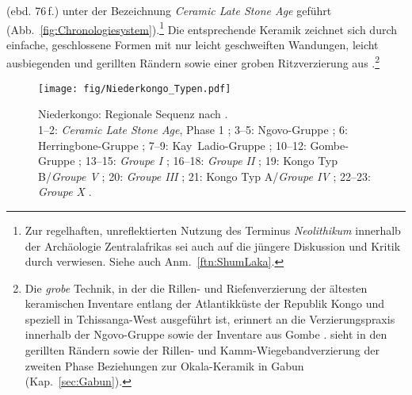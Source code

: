 (ebd. 76\,f.) unter der Bezeichnung \textit{Ceramic Late Stone Age} geführt (Abb.~\ref{fig:Chronologiesystem}).\footnote{Zur regelhaften, unreflektierten Nutzung des Terminus \textit{Neolithikum} innerhalb der Archäologie Zentralafrikas sei auch auf die jüngere Diskussion und Kritik durch \textcite[186\,f.]{Eggert.2014} verwiesen. Siehe auch Anm.~\ref{ftn:ShumLaka}.\label{ftn:Neolithikum}} Die entsprechende Keramik zeichnet sich durch einfache, geschlossene Formen mit nur leicht geschweiften Wandungen, leicht ausbiegenden und gerillten Rändern sowie einer groben Ritzverzierung aus \parencites[148 Abb.~5]{Denbow.1990}[393; Abb.~\ref{fig:Niederkongo_Sequence}.1--2]{Denbow.2012}.\footnote{Die \textit{grobe} Technik, in der die Rillen- und Riefenverzierung der ältesten keramischen Inventare entlang der Atlantikküste der Republik Kongo und speziell in Tchissanga-West ausgeführt ist, erinnert an die Verzierungspraxis innerhalb der Ngovo-Gruppe \parencites[107\,f. Abb.~3--4, 111\,f. Abb.~5--6]{deMaret.1986}[396]{Denbow.2012} sowie der Inventare aus Gombe \parencite[454 Abb.~4]{Maret.1990}. \textcite[396]{Denbow.2012} sieht in den gerillten Rändern sowie der Rillen- und Kamm-Wiegebandverzierung der zweiten Phase Beziehungen zur Okala-Keramik \parencite[267--274]{Clist.20042005} in Gabun (Kap.~\ref{sec:Gabun}).}

\begin{figure*}[p]
	\centering
	\texttt{[image: fig/Niederkongo\_Typen.pdf]}
	\caption{Niederkongo: Regionale Sequenz nach \textcites{deMaret.1982c}{deMaret.1986}{Gosselain.1988}{Denbow.2012}{Denbow.2014}.\\1--2: \textit{Ceramic Late Stone Age}, Phase 1 \parencite[148 Abb.~5]{Denbow.1990}; 3--5: Ngovo-Gruppe \parencite[108 Abb.~4.7, Abb.~4.11, 111 Abb.~5.3]{deMaret.1986}; 6: Herringbone-Gruppe \parencite[156 Abb.~10]{Denbow.1990}; 7--9: Kay~Ladio-Gruppe \parencite[454 Abb.~3.1--3]{Maret.1990}; 10--12: Gombe-Gruppe \parencites[Île des Mimosas; ][279 Abb.~8.1]{Eggert.1984}[454 Abb.~4.1--2]{Maret.1990}; 13--15: \textit{Groupe I} \parencite{deMaret.1972}; 16--18: \textit{Groupe II} \parencites{deMaret.1972}[Abb.~5.1--2]{Gosselain.1988}; 19: Kongo Typ B/\textit{Groupe V} \parencites{deMaret.1972}[Abb.~23.3]{vanNoten.1982}; 20: \textit{Groupe III} \parencites{deMaret.1972}[Abb.~23.1]{vanNoten.1982}; 21: Kongo Typ A/\textit{Groupe IV} \parencites{deMaret.1972}[Abb.~23.2]{vanNoten.1982}; 22--23: \textit{Groupe X} \parencite[483 Abb.~5.6]{deMaret.1999}.}
	\label{fig:Niederkongo_Sequence}
\end{figure*}

